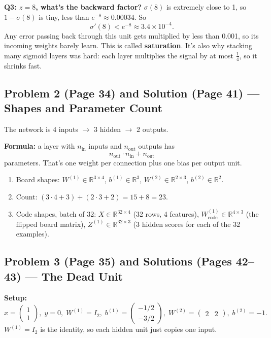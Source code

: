 \textbf{Q3: $z = 8$, what's the backward factor?}
$\sigma(8)$ is extremely close to 1, so $1 - \sigma(8)$ is tiny, less than $e^{-8} \approx 0.00034$. So
\[
\sigma'(8) < e^{-8} \approx 3.4 \times 10^{-4}.
\]
Any error passing back through this unit gets multiplied by less than 0.001, so its incoming weights barely learn. This is called \textbf{saturation}. It's also why stacking many sigmoid layers was hard: each layer multiplies the signal by at most $\tfrac14$, so it shrinks fast.

\subsection*{Problem 2 (Page 34) and Solution (Page 41) --- Shapes and Parameter Count}

The network is 4 inputs $\to$ 3 hidden $\to$ 2 outputs.

\textbf{Formula:} a layer with $n_{\text{in}}$ inputs and $n_{\text{out}}$ outputs has
\[
n_{\text{out}} \cdot n_{\text{in}} + n_{\text{out}}
\]
parameters. That's one weight per connection plus one bias per output unit.

\begin{enumerate}[leftmargin=*]
  \item Board shapes: $W^{(1)} \in \mathbb{R}^{3\times4}$, $b^{(1)} \in \mathbb{R}^{3}$, $W^{(2)} \in \mathbb{R}^{2\times3}$, $b^{(2)} \in \mathbb{R}^{2}$.
  \item Count: $(3\cdot4 + 3) + (2\cdot3 + 2) = 15 + 8 = 23$.
  \item Code shapes, batch of 32: $X \in \mathbb{R}^{32\times4}$ (32 rows, 4 features), $W^{(1)}_{\text{code}} \in \mathbb{R}^{4\times3}$ (the flipped board matrix), $Z^{(1)} \in \mathbb{R}^{32\times3}$ (3 hidden scores for each of the 32 examples).
\end{enumerate}

\subsection*{Problem 3 (Page 35) and Solutions (Pages 42--43) --- The Dead Unit}

\textbf{Setup:}
\[
x = \begin{pmatrix} 1 \\ 1 \end{pmatrix},\; y = 0,\; W^{(1)} = I_2,\; b^{(1)} = \begin{pmatrix} -1/2 \\ -3/2 \end{pmatrix},\; W^{(2)} = \begin{pmatrix} 2 & 2 \end{pmatrix},\; b^{(2)} = -1.
\]
$W^{(1)} = I_2$ is the identity, so each hidden unit just copies one input.

